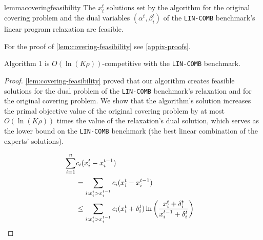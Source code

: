 \begin{restatable}{lemma}{coveringfeasibility}
	\label{lem:covering-feasibility}
	The $x_{i}^{t}$ solutions set by the algorithm for the original covering problem and the dual variables $(\alpha^{t}, \beta_{i}^{t})$ of the \texttt{LIN-COMB} benchmark's linear program relaxation are feasible.
\end{restatable}
For the proof of \cref{lem:covering-feasibility} see \cref{appix-proofs}.

\begin{theorem} \label{covering-theorem}
Algorithm 1 is $O(\ln(K \rho))$-competitive with the \texttt{LIN-COMB} benchmark.
\end{theorem}
%
\begin{proof} \cref{lem:covering-feasibility} proved that our algorithm creates feasible solutions for the dual problem of the \texttt{LIN-COMB} benchmark's relaxation and for the original covering problem. We show that the algorithm's solution increases the primal objective value of the original covering problem by at most $O(\ln(K \rho))$ times the value of the relaxation's dual solution, which serves as the lower bound on the \texttt{LIN-COMB} benchmark (the best linear combination of the experts' solutions).

\begin{align}
	 \sum_{i=1}^{n} &c_{i} (x_{i}^{t} - x_{i}^{t-1}) & \notag \\
		&= \sum_{i: x_{i}^{t} > x_{i}^{t-1}} c_{i}(x_{i}^{t} - x_{i}^{t-1})  \notag \\
		&\leq \sum_{i: x_{i}^{t} > x_{i}^{t-1}} c_{i}(x_{i}^{t} + \delta_{i}^{t}) \ln \left(\frac{x_{i}^{t} + \delta_{i}^{t}}{x_{i}^{t-1} + \delta_{i}^{t}}\right)
\end{align}


\end{proof}
